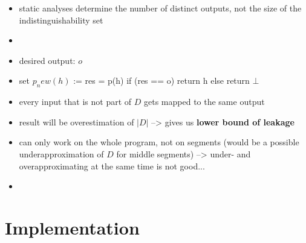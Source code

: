 \begin{itemize}
    \item static analyses determine the number of distinct outputs, not the size of the indistinguishability set
    \item {}
    \item desired output: $o$
    \item set $p_new(h)$ := res = p(h) if (res == o) return h else return $\bot$
    \item every input that is not part of $D$ gets mapped to the same output
    \item result will be overestimation of $|D|$ --> gives us \textbf{lower bound of leakage}
    \item can only work on the whole program, not on segments (would be a possible underapproximation of $D$ for middle segments) --> under- and overapproximating at the same time is not good...
    \item {}
\end{itemize}

\section{Implementation}